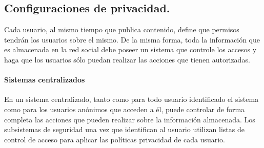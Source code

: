 


\subsection{Configuraciones de privacidad.}
\label{sec:privacidad}

    Cada usuario, al mismo tiempo que publica contenido, define que permisos
    tendrán los usuarios sobre el mismo. De la misma forma, toda la información que
    es almacenada en la red social debe poseer un sistema que controle los accesos
    y haga que los usuarios sólo puedan realizar las acciones que tienen
    autorizadas.
    
    \paragraph{Sistemas centralizados}
    En un sistema centralizado, tanto como para  todo usuario identificado el
    sistema como para los usuarios anónimos que acceden a él, puede controlar de
    forma completa las acciones que pueden realizar sobre la información
    almacenada. Los subsistemas de seguridad una vez que
    identifican al usuario utilizan listas de control de acceso para aplicar las
    políticas privacidad de cada usuario.
    
